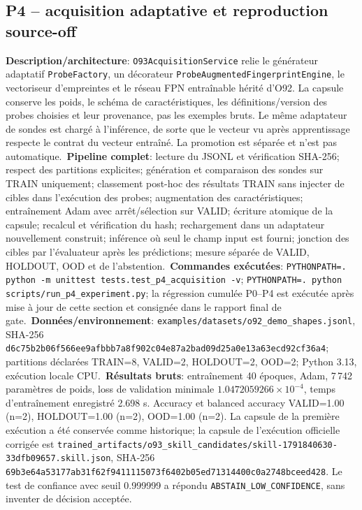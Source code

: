 \documentclass[11pt,a4paper,oneside]{report}
\begin{document}
\subsection{P4 -- acquisition adaptative et reproduction source-off}
\textbf{Description/architecture}: \texttt{O93AcquisitionService} relie le générateur adaptatif \texttt{ProbeFactory}, un décorateur \texttt{ProbeAugmentedFingerprintEngine}, le vectoriseur d'empreintes et le réseau FPN entraînable hérité d'O92. La capsule conserve les poids, le schéma de caractéristiques, les définitions/version des probes choisies et leur provenance, pas les exemples bruts. Le même adaptateur de sondes est chargé à l'inférence, de sorte que le vecteur vu après apprentissage respecte le contrat du vecteur entraîné. La promotion est séparée et n'est pas automatique.\
\textbf{Pipeline complet}: lecture du JSONL et vérification SHA-256; respect des partitions explicites; génération et comparaison des sondes sur TRAIN uniquement; classement post-hoc des résultats TRAIN sans injecter de cibles dans l'exécution des probes; augmentation des caractéristiques; entraînement Adam avec arrêt/sélection sur VALID; écriture atomique de la capsule; recalcul et vérification du hash; rechargement dans un adaptateur nouvellement construit; inférence où seul le champ input est fourni; jonction des cibles par l'évaluateur après les prédictions; mesure séparée de VALID, HOLDOUT, OOD et de l'abstention.\
\textbf{Commandes exécutées}: \texttt{PYTHONPATH=. python -m unittest tests.test\_p4\_acquisition -v}; \texttt{PYTHONPATH=. python scripts/run\_p4\_experiment.py}; la régression cumulée P0--P4 est exécutée après mise à jour de cette section et consignée dans le rapport final de gate.\
\textbf{Données/environnement}: \texttt{examples/datasets/o92\_demo\_shapes.jsonl}, SHA-256 \texttt{d6c75b2b06f566ee9afbbb7a8f902c04e87a2bad09d25a0e13a63ecd92cf36a4}; partitions déclarées TRAIN=8, VALID=2, HOLDOUT=2, OOD=2; Python 3.13, exécution locale CPU.\
\textbf{Résultats bruts}: entraînement 40 époques, Adam, 7\,742 paramètres de poids, loss de validation minimale $1.0472059266\times10^{-4}$, temps d'entraînement enregistré 2.698 s. Accuracy et balanced accuracy VALID=1.00 (n=2), HOLDOUT=1.00 (n=2), OOD=1.00 (n=2). La capsule de la première exécution a été conservée comme historique; la capsule de l'exécution officielle corrigée est \texttt{trained\_artifacts/o93\_skill\_candidates/skill-1791840630-33dfb09657.skill.json}, SHA-256 \texttt{69b3e64a53177ab31f62f9411115073f6402b05ed71314400c0a2748bceed428}. Le test de confiance avec seuil 0.999999 a répondu \texttt{ABSTAIN\_LOW\_CONFIDENCE}, sans inventer de décision acceptée.\
\end{document}
